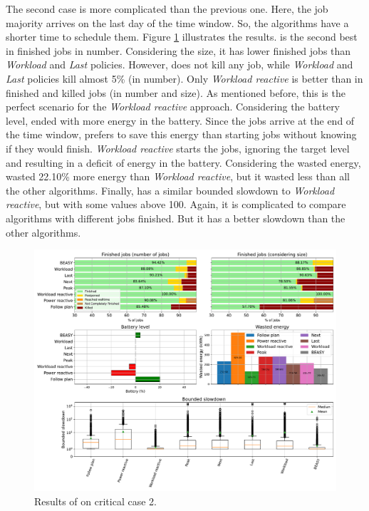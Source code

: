 The second case is more complicated than the previous one. Here, the job majority arrives on the last day of the time window. So, the algorithms have a shorter time to schedule them. Figure \ref{fig:beasy_critical_2} illustrates the results. \emph{\systemName} is the second best in finished jobs in number. Considering the size, it has lower finished jobs than \emph{Workload} and \emph{Last} policies. However, \emph{\systemName} does not kill any job, while \emph{Workload} and \emph{Last} policies kill almost 5\% (in number). Only \emph{Workload reactive} is better than \emph{\systemName} in finished and killed jobs (in number and size). As mentioned before, this is the perfect scenario for the \emph{Workload reactive} approach. Considering the battery level, \emph{\systemName} ended with more energy in the battery. Since the jobs arrive at the end of the time window, \emph{\systemName} prefers to save this energy than starting jobs without knowing if they would finish. \emph{Workload reactive} starts the jobs, ignoring the target level and resulting in a deficit of energy in the battery. Considering the wasted energy, \emph{\systemName} wasted 22.10\% more energy than \emph{Workload reactive}, but it wasted less than all the other algorithms. Finally, \emph{\systemName} has a similar bounded slowdown to \emph{Workload reactive}, but with some values above 100. Again, it is complicated to compare algorithms with different jobs finished. But it has a better slowdown than the other algorithms.
 
\begin{figure}[!htb]
    \centering
    \includegraphics[scale=0.39]{Images/Heuristic/profile_best_workload_2_with_noise.pdf}
    \caption{Results of \emph{\systemName} on critical case 2.}
    \label{fig:beasy_critical_2}
\end{figure}

